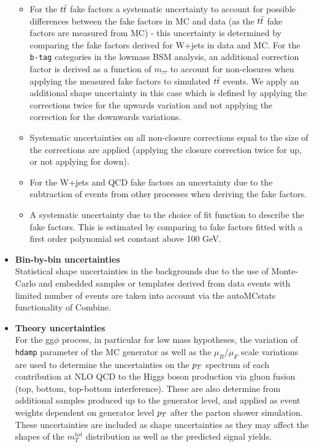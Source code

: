 \begin{itemize}
\begin{itemize}
\item For the $t\bar{t}$ fake factors a systematic uncertainty to account for possible differences between the fake factors in MC and data (as the $t\bar{t}$ fake factors are measured from MC) - this uncertainty is determined by comparing the fake factors derived for W+jets in data and MC. For the \texttt{b-tag} categories in the lowmass BSM analysis, an additional correction factor is derived as a function of $m_{\tau\tau}$ to account for non-closures when applying the measured fake factors to simulated $t\bar{t}$ events. We apply an additional shape uncertainty in this case which is defined by applying the corrections twice for the upwards variation and not applying the correction for the downwards variations.
\item Systematic uncertainties on all non-closure corrections equal to the size of the corrections are applied (applying the closure correction twice for up, or not applying for down).
\item For the W+jets and QCD fake factors an uncertainty due to the subtraction of events from other processes when deriving the fake factors.
\item A systematic uncertainty due to the choice of fit function to describe the fake factors. This is estimated by comparing to fake factors fitted with a first order polynomial set constant above 100 GeV.  
\end{itemize}

\item {\bf Bin-by-bin uncertainties} \\
Statistical shape uncertainties in the backgrounds due to the use of Monte-Carlo and embedded samples or templates derived from data events with limited number of events are taken into account via the autoMCstats functionality of Combine.

\item \textbf{Theory uncertainties}\\

For the gg$\phi$ process, in particular for low mass hypotheses, the variation of \texttt{hdamp} parameter of the \POWHEG MC generator as well as the $\mu_{R}$/$\mu_{F}$ scale variations are used to determine the uncertainties
on the $p_{T}$ spectrum of each contribution at NLO QCD to the Higgs boson production via gluon fusion (top, bottom, top-bottom interference). These are also determine from additional samples produced
up to the generator level, and applied as event weights dependent on generator level $p_{T}$ after the parton shower simulation. These uncertainties are included as shape uncertainties as they may affect the shapes of the $m_{T}^{\text{tot}}$ distribution as well as the predicted signal yields.



\end{itemize}
